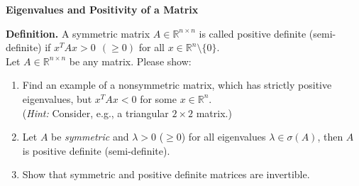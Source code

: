 \textbf{Eigenvalues and Positivity of a Matrix}

{\color{navy}
	\textbf{Definition.} A symmetric matrix $A\in \mathbb{R}^{n\times n}$ is called positive definite (semi-definite) if $x^TAx > 0 ~~(\geq 0)$ for all $x \in \mathbb{R}^n\setminus\{0\}$.\\[10pt]}
Let $A\in \mathbb{R}^{n\times n}$ be any matrix. Please show:
\begin{enumerate}
	\item Find an example of a nonsymmetric matrix, which has strictly positive eigenvalues, but  $x^TAx < 0$ for some $x \in \mathbb{R}^n$.\\
	(\textit{Hint:} Consider, e.g., a triangular $2 \times 2$ matrix.)
	\item Let $A$ be \textit{symmetric} and $\lambda > 0$ ($\geq 0$) for all eigenvalues $\lambda \in \sigma(A)$, then $A$ is positive definite (semi-definite).
	\item Show that symmetric and positive definite matrices are invertible.
\end{enumerate}
